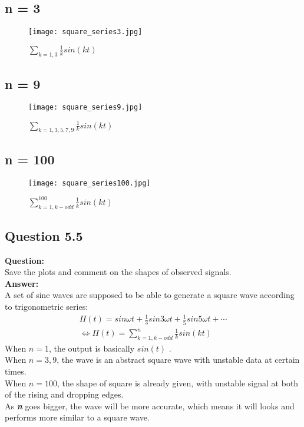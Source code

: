 \documentclass[12pt,fleqn]{article}
\begin{document}
\subsection{n = 3}
\begin{figure}[H]
\centering
\texttt{[image: square\_series3.jpg]}
\caption{$\sum_{k=1,3}\frac{1}{k}sin(kt)$}
\end{figure}

\subsection{n = 9}
\begin{figure}[H]
\centering
\texttt{[image: square\_series9.jpg]}
\caption{$\sum_{k=1,3,5,7,9}\frac{1}{k}sin(kt)$}
\end{figure}

\subsection{n = 100}
\begin{figure}[H]
\centering
\texttt{[image: square\_series100.jpg]}
\caption{$\sum_{k=1,k-odd}^{100}\frac{1}{k}sin(kt)$}
\end{figure}
\subsection{Question 5.5}
\textbf{Question:}\\
Save the plots and comment on the shapes of observed signals.\\
\textbf{Answer:}\\
A set of sine waves are supposed to be able to generate a square wave according to trigonometric series:
\begin{gather}
\Pi(t) = sin\omega{}t+\frac{1}{3}sin3\omega{}t+\frac{1}{5}sin5\omega{}t+\cdots\\
\Leftrightarrow{}\Pi(t) =\sum_{k=1,k-odd}^n\frac{1}{k}sin(kt)
\end{gather}
When $n = 1$, the output is basically $sin(t)$ .\\
When $n = 3, 9$, the wave is an abstract square wave with unstable data at certain times.\\
When $n = 100$, the shape of square is already given, with unstable signal at both of the rising and dropping edges.\\
As \emph{\textbf{n}} goes bigger, the wave will be more accurate, which means it will looks and performs more similar to a square wave.
\end{document}
